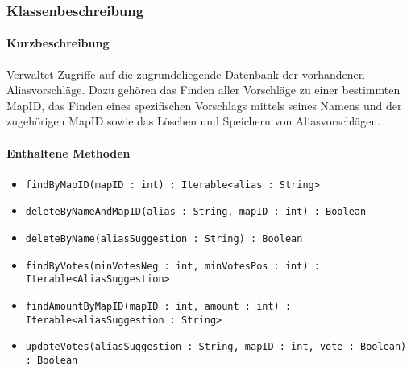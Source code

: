 \subsubsection*{Klassenbeschreibung}%
\paragraph*{Kurzbeschreibung}
Verwaltet Zugriffe auf die zugrundeliegende Datenbank der vorhandenen Aliasvorschläge.
Dazu gehören das Finden aller Vorschläge zu einer bestimmten MapID, das Finden eines spezifischen Vorschlags mittels 
seines Namens und der zugehörigen MapID sowie das Löschen und Speichern von Aliasvorschlägen.
\paragraph*{Enthaltene Methoden}
\begin{itemize}
    \item \texttt{findByMapID(mapID : int) : Iterable<alias : String>}
    \item \texttt{deleteByNameAndMapID(alias : String, mapID : int) : Boolean}
    \item \texttt{deleteByName(aliasSuggestion : String) : Boolean}
    \item \texttt{findByVotes(minVotesNeg : int, minVotesPos : int) : Iterable<AliasSuggestion>}
    \item \texttt{findAmountByMapID(mapID : int, amount : int) : Iterable<aliasSuggestion : String>}
    \item \texttt{updateVotes(aliasSuggestion : String, mapID : int, vote : Boolean) : Boolean}
\end{itemize}
